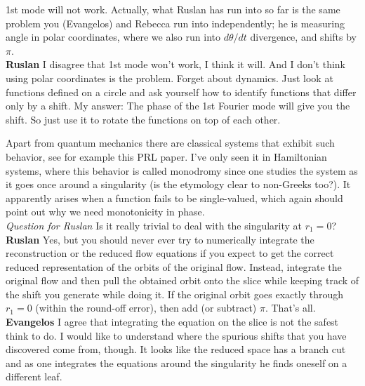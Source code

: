 \medskip{} 1st mode will not work. Actually,
what Ruslan has run into so far is the same problem you
(Evangelos) and Rebecca run into independently; he is
measuring angle in polar coordinates, where we also run into
$d\theta/dt$ divergence, and shifts by $\pi$.
\\
{\bf Ruslan} I disagree that 1st mode won't work, I think it
will. And I don't think using polar coordinates is the
problem.  Forget about dynamics.  Just look at functions
defined on a circle and ask yourself how to identify
functions that differ only by a shift.  My answer: The phase
of the 1st Fourier mode will give you the shift.  So just use
it to rotate the functions on top of each other.

 Apart from quantum mechanics there
are classical systems that exhibit such behavior, see for
example
{this PRL paper}. I've only seen it in Hamiltonian systems,
where this behavior is called monodromy since one studies the
system as it goes once around a singularity (is the etymology
clear to non-Greeks too?). It apparently arises when a
function fails to be single-valued, which again should point
out why we need monotonicity in phase.\\
\textit{Question for Ruslan} Is it really trivial to deal
with the singularity at $r_1=0$?\\
{\bf Ruslan} Yes, but you should never ever try to
numerically integrate the reconstruction or the reduced flow
equations if you expect to get the correct reduced
representation of the orbits of the original flow.  Instead,
integrate the original flow and then pull the obtained orbit
onto the slice while keeping track of the shift you generate
while doing it.  If the original orbit goes exactly through
$r_1 = 0$ (within the round-off error), then add (or
subtract) $\pi$.  That's all.\\
{\bf Evangelos}  I agree that integrating the equation on the
slice is not the safest think to do. I would like to
understand where the spurious shifts that you have discovered
come from, though. It looks like the reduced space has a
branch cut and as one integrates the equations around the
singularity he finds oneself on a different leaf.

